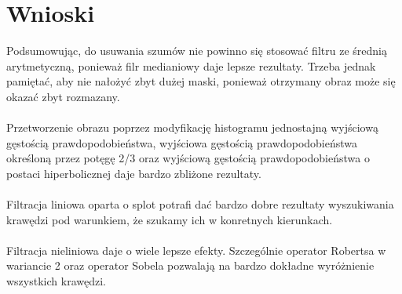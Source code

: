 \documentclass{classrep}
\begin{document}
\section{Wnioski}
Podsumowując, do usuwania szumów nie powinno się stosować filtru ze średnią arytmetyczną, ponieważ filr medianiowy daje lepsze rezultaty. Trzeba jednak pamiętać, aby nie nałożyć zbyt dużej maski, ponieważ otrzymany obraz może się okazać zbyt rozmazany.\\
\\
\indent
Przetworzenie obrazu poprzez modyfikację histogramu jednostajną wyjściową gęstością prawdopodobieństwa, wyjściowa gęstością prawdopodobieństwa określoną przez potęgę 2/3 oraz wyjściową gęstością prawdopodobieństwa o postaci hiperbolicznej daje bardzo zbliżone rezultaty.\\
\\
\indent
Filtracja liniowa oparta o splot potrafi dać bardzo dobre rezultaty wyszukiwania krawędzi pod warunkiem, że szukamy ich w konretnych kierunkach.\\
\\
\indent
Filtracja nieliniowa daje o wiele lepsze efekty. Szczególnie operator Robertsa w wariancie 2 oraz operator Sobela pozwalają na bardzo dokładne wyróżnienie wszystkich krawędzi.

\begin{thebibliography}{1}
\\
\end{thebibliography}
\end{document}
